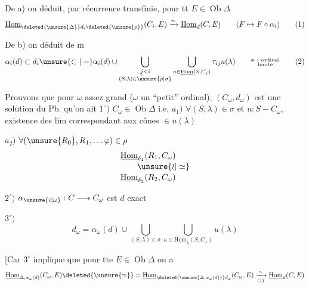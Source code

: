 
De a) on déduit, par récurrence transfinie, pour tt $E\in\operatorname{Ob}\Delta$
\[
 \underline{\mathrm{Hom}}_{\deleted{\unsure{\Delta}}d_i\deleted{\unsure{\rho}}}(C_i,E)\xrightarrow{\sim}
 \underline{\mathrm{Hom}}_d(C,E)\qquad(F\mapsto F\circ\alpha_i)\tag*{(1)}
\]

De b) on déduit de $\overline{\mathrm m}$
\[
 \alpha_i(d)\subset d_i\unsure{\subset|=}\alpha_i(d)\cup
 \bigcup_{\substack{\underline{j}<i\\(S,\lambda)\in\unsure{\rho|\sigma}}}
 \bigcup_{u\in\underline{\mathrm{Hom}}(S,C_j)}
 \tau_{ij}u(\lambda)\qquad\substack{\text{si }i\text{ ordinal}\\\text{limite}}\tag*{(2)}
\]

Prouvons que pour $\omega$  assez grand ($\omega$ un ``petit'' ordinal), $(C_\omega,d_\omega)$ est une solution du Pb.   qu'on ait
$1^\circ)$ $C_\omega\in\operatorname{Ob}\Delta$ i.e. \quad $a_1)$ $\forall(S,\lambda)\in\sigma$ et $u:S-C_\omega$, existence des lim correspondant aux cônes $\in u(\lambda)$
\par $a_2)$ $\forall(\unsure{R_0},R_1,\ldots\varphi)\in\rho$ 
\[
 \begin{aligned}
 &\underline{\mathrm{Hom}}_{\delta_1}(R_1,C_\omega)\\[-2pt]
 &\hspace{2em}\unsure{\wr|\simeq}\\[-2pt]
 &\underline{\mathrm{Hom}}_{\delta_2}(R_2,C_\omega)
 \end{aligned}
\]

$2^\circ)$ $\alpha_{\unsure{i|\omega}}:C\longrightarrow C_\omega$ est $d$ exact

$3^\circ)$ 
\[
 d_\omega=\alpha_\omega(d)\cup\bigcup_{(S,\lambda)\in\sigma}
 \bigcup_{u\in\underline{\mathrm{Hom}}_\lambda(S,C_\omega)}u(\lambda)
\]

[Car $3^\circ$ implique que pour tte $E\in\operatorname{Ob}\Delta$ on a
\[
 \underline{\mathrm{Hom}}_{\Delta,\alpha_\omega(d)}(C_\omega,E)\deleted{\unsure{\simeq}}=
 \underline{\mathrm{Hom}}_{\deleted{\unsure{\Delta,\alpha_\omega(d)}}d_\omega}(C_\omega,E)
 \xrightarrow[(1)]{\sim}\underline{\mathrm{Hom}}_d(C,E)
\]

